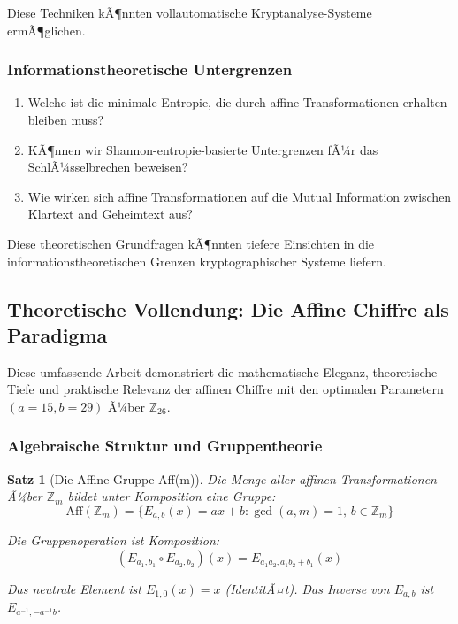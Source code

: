 ﻿\documentclass[12pt,a4paper]{article}
\newtheorem{theorem}{Satz}
\begin{document}
	Diese Techniken kÃ¶nnten vollautomatische Kryptanalyse-Systeme ermÃ¶glichen.
	
	\subsubsection{Informationstheoretische Untergrenzen}
	
	\begin{enumerate}
		\item Welche ist die minimale Entropie, die durch affine Transformationen erhalten bleiben muss?
		\item KÃ¶nnen wir Shannon-entropie-basierte Untergrenzen fÃ¼r das SchlÃ¼sselbrechen beweisen?
		\item Wie wirken sich affine Transformationen auf die Mutual Information zwischen Klartext and Geheimtext aus?
	\end{enumerate}
	
	Diese theoretischen Grundfragen kÃ¶nnten tiefere Einsichten in die informationstheoretischen Grenzen kryptographischer Systeme liefern.
	
	
	\subsection{Theoretische Vollendung: Die Affine Chiffre als Paradigma}
	
	Diese umfassende Arbeit demonstriert die mathematische Eleganz, theoretische Tiefe und praktische Relevanz der affinen Chiffre mit den optimalen Parametern $(a=15, b=29)$ Ã¼ber $\mathbb{Z}_{26}$.
	
	\subsubsection{Algebraische Struktur und Gruppentheorie}
	
	\begin{theorem}[Die Affine Gruppe Aff(m)]
		Die Menge aller affinen Transformationen Ã¼ber $\mathbb{Z}_m$ bildet unter Komposition eine Gruppe:
		\begin{equation}
			\mathrm{Aff}(\mathbb{Z}_m) = \{E_{a,b}(x) = ax + b : \gcd(a, m) = 1, \, b \in \mathbb{Z}_m\}
		\end{equation}
		
		Die Gruppenoperation ist Komposition:
		\begin{equation}
			(E_{a_1, b_1} \circ E_{a_2, b_2})(x) = E_{a_1 a_2, a_1 b_2 + b_1}(x)
		\end{equation}
		
		Das neutrale Element ist $E_{1, 0}(x) = x$ (IdentitÃ¤t).
		Das Inverse von $E_{a, b}$ ist $E_{a^{-1}, -a^{-1}b}$.
	\end{theorem}
	
\end{document}
